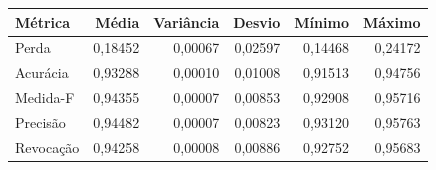 \begin{tabular}{lrrrrr}
\toprule
Métrica & Média & Variância & Desvio & Mínimo & Máximo \\
\midrule
Perda & 0,18452 & 0,00067 & 0,02597 & 0,14468 & 0,24172 \\
Acurácia & 0,93288 & 0,00010 & 0,01008 & 0,91513 & 0,94756 \\
Medida-F & 0,94355 & 0,00007 & 0,00853 & 0,92908 & 0,95716 \\
Precisão & 0,94482 & 0,00007 & 0,00823 & 0,93120 & 0,95763 \\
Revocação & 0,94258 & 0,00008 & 0,00886 & 0,92752 & 0,95683 \\
\bottomrule
\end{tabular}
